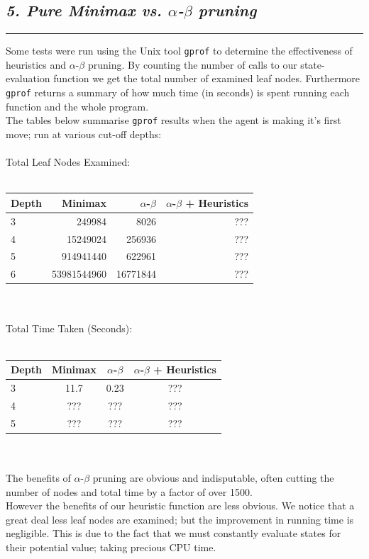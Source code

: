 \documentclass[10pt,twocolumn]{article}
\begin{document}
\subsection*{\emph { \textmd{5. Pure Minimax vs. $\alpha$-$\beta$ pruning}}}
\hrule
\vspace{0.4cm}
Some tests were run using the Unix tool \texttt{gprof} to determine the effectiveness
of heuristics and $\alpha$-$\beta$ pruning. By counting the number of calls
to our state-evaluation function we get the total number of examined leaf nodes.
Furthermore \texttt{gprof} returns a summary of how much time (in seconds) is spent running
each function and the whole program.\\
The tables below summarise \texttt{gprof} results when the agent is making it's first move;
run at various cut-off depths:\\\\
Total Leaf Nodes Examined:\\\\
\begin{tabular}{  l  r r r  }
  \toprule
  Depth & Minimax & $\alpha$-$\beta$ & $\alpha$-$\beta$ + Heuristics \\
  \midrule
  3 & 249984 & 8026 & ??? \\
  4 & 15249024 & 256936 & ??? \\
  5 & 914941440 & 622961 & ??? \\
  6 & 53981544960 & 16771844 & ??? \\
  \bottomrule
\end{tabular}\\\\
Total Time Taken (Seconds):\\\\
\begin{tabular}{ l  c c c  }
  \toprule
  Depth & Minimax & $\alpha$-$\beta$ & $\alpha$-$\beta$ + Heuristics \\
  \midrule
  3 & 11.7 & 0.23 & ??? \\
  4 & ??? & ??? & ??? \\
  5 & ??? & ??? & ??? \\
  \bottomrule
\end{tabular}\\\\
The benefits of $\alpha$-$\beta$ pruning are obvious and indisputable, often cutting
the number of nodes and total time by a factor of over 1500.\\
However the benefits of our heuristic function are less obvious. We notice that
a great deal less leaf nodes are examined; but the improvement in running time is
negligible. This is due to the fact that we must constantly evaluate states for their
potential value; taking precious CPU time.
\end{document}
